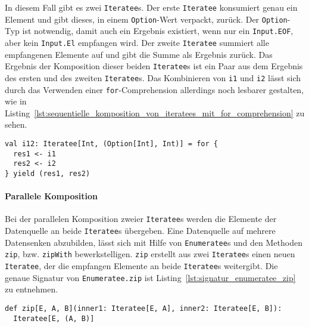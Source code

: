 \documentclass[draft=false
              ,paper=a4
              ,twoside=false
              ,fontsize=11pt
              ,headsepline
              ,BCOR10mm
              ,DIV11
              ]{scrbook}
\begin{document}
In diesem Fall gibt es zwei \lstinline|Iteratee|s.
Der erste \lstinline|Iteratee| konsumiert genau ein Element und gibt dieses, in einem \lstinline|Option|-Wert verpackt, zurück.
Der \lstinline|Option|-Typ ist notwendig, damit auch ein Ergebnis existiert, wenn nur ein \lstinline|Input.EOF|, aber kein \lstinline|Input.El| empfangen wird.
Der zweite \lstinline|Iteratee| summiert alle empfangenen Elemente auf und gibt die Summe als Ergebnis zurück.
Das Ergebnis der Komposition dieser beiden \lstinline|Iteratee|s ist ein Paar aus dem Ergebnis des ersten und des zweiten \lstinline|Iteratee|s.
Das Kombinieren von \lstinline|i1| und \lstinline|i2| lässt sich durch das Verwenden einer \lstinline|for|-Comprehension allerdings noch lesbarer gestalten, wie in Listing~\ref{lst:sequentielle_komposition_von_iteratees_mit_for_comprehension} zu sehen.

\begin{lstlisting}[caption=Sequentielle Komposition von Iteratees mit for-Comprehension, label=lst:sequentielle_komposition_von_iteratees_mit_for_comprehension]
val i12: Iteratee[Int, (Option[Int], Int)] = for {
  res1 <- i1
  res2 <- i2
} yield (res1, res2)
\end{lstlisting}


\paragraph{Parallele Komposition} %
\label{p:anwendung_parallele_komposition_von_iteratees}\mbox{} %

Bei der parallelen Komposition zweier \lstinline|Iteratee|s werden die Elemente der Datenquelle an beide \lstinline|Iteratee|s übergeben.
Eine Datenquelle auf mehrere Datensenken abzubilden, lässt sich mit Hilfe von \lstinline|Enumeratee|s und den Methoden \lstinline|zip|, bzw. \lstinline|zipWith| bewerkstelligen.
\lstinline|zip| erstellt aus zwei \lstinline|Iteratee|s einen neuen \lstinline|Iteratee|, der die empfangen Elemente an beide \lstinline|Iteratee|s weitergibt.
Die genaue Signatur von \lstinline|Enumeratee.zip| ist Listing~\ref{lst:signatur_enumeratee_zip} zu entnehmen.

\begin{lstlisting}[caption=Die Signatur von Enumeratee.zip, label=lst:signatur_enumeratee_zip]
def zip[E, A, B](inner1: Iteratee[E, A], inner2: Iteratee[E, B]):
  Iteratee[E, (A, B)]
\end{lstlisting}
\end{document}
